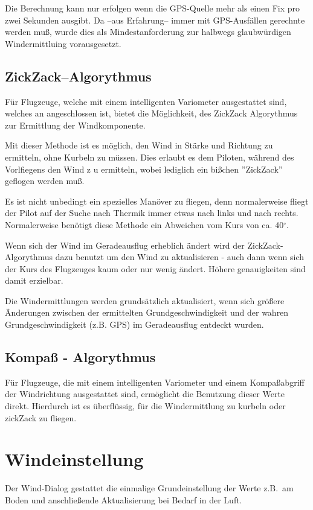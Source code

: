 Die Berechnung kann nur erfolgen wenn die GPS-Quelle mehr als einen Fix pro zwei Sekunden ausgibt. 
Da --aus Erfahrung-- immer mit GPS-Ausfällen gerechnte werden muß, wurde dies als Mindestanforderung zur halbwegs glaubwürdigen Windermittluing vorausgesetzt.  
 
\subsection*{ZickZack--Algorythmus}
Für Flugzeuge, welche mit einem intelligenten Variometer ausgestattet sind, welches
an \xc angeschlossen ist, bietet \xc die Möglichkeit, des ZickZack Algorythmus
zur Ermittlung der Windkomponente.

Mit dieser Methode ist es möglich, den Wind in Stärke und Richtung zu ermitteln, ohne Kurbeln zu müssen.
Dies erlaubt es dem Piloten,  während des Vorlfiegens den Wind z u ermitteln, wobei lediglich ein
bißchen ''ZickZack'' geflogen werden muß.

Es ist nicht unbedingt ein spezielles Manöver zu fliegen, denn normalerweise  fliegt der Pilot auf
der Suche nach Thermik immer etwas nach links und nach rechts. Normalerweise benötigt diese
Methode ein Abweichen vom Kurs von ca. 40$^\circ$.

Wenn sich der Wind im Geradeausflug erheblich ändert wird der ZickZack-Algorythmus dazu benutzt
um den Wind zu aktualisieren - auch dann wenn sich der Kurs des Flugzeuges kaum oder nur wenig ändert.
Höhere genauigkeiten sind damit erzielbar.

Die Windermittlungen werden grundsätzlich aktualisiert, wenn sich größere Änderungen zwischen  der
ermittelten Grundgeschwindigkeit und der wahren Grundgeschwindigkeit (z.B. GPS)
im Geradeausflug entdeckt wurden.
\subsection*{Kompaß - Algorythmus}
Für Flugzeuge, die mit einem intelligenten Variometer und einem Kompaßabgriff der
Windrichtung ausgestattet sind, ermöglicht  \xc die Benutzung dieser Werte direkt.
Hierdurch ist es überflüssig, für die Windermittlung zu kurbeln oder zickZack zu fliegen.
\section{Windeinstellung}\label{sec:Windeinstellung}
Der Wind-Dialog gestattet die einmalige Grundeinstellung der Werte  z.B.\ am Boden und
anschließende Aktualisierung bei Bedarf in der Luft. 

